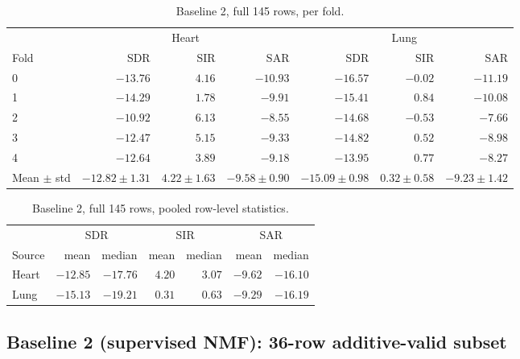 \documentclass[11pt]{article}
\begin{document}
\begin{table}[H]
\centering
\caption{Baseline 2, full 145 rows, per fold.}
\small
\begin{tabular}{@{}lrrrrrr@{}}
\toprule
& \multicolumn{3}{c}{Heart} & \multicolumn{3}{c}{Lung} \\
Fold & SDR & SIR & SAR & SDR & SIR & SAR \\
\midrule
0 & $-13.76$ & $4.16$ & $-10.93$ & $-16.57$ & $-0.02$ & $-11.19$ \\
1 & $-14.29$ & $1.78$ & $-9.91$  & $-15.41$ & $0.84$  & $-10.08$ \\
2 & $-10.92$ & $6.13$ & $-8.55$  & $-14.68$ & $-0.53$ & $-7.66$ \\
3 & $-12.47$ & $5.15$ & $-9.33$  & $-14.82$ & $0.52$  & $-8.98$ \\
4 & $-12.64$ & $3.89$ & $-9.18$  & $-13.95$ & $0.77$  & $-8.27$ \\
\midrule
Mean $\pm$ std & $-12.82\pm1.31$ & $4.22\pm1.63$ & $-9.58\pm0.90$ & $-15.09\pm0.98$ & $0.32\pm0.58$ & $-9.23\pm1.42$ \\
\bottomrule
\end{tabular}
\end{table}

\begin{table}[H]
\centering
\caption{Baseline 2, full 145 rows, pooled row-level statistics.}
\small
\begin{tabular}{@{}lrrrrrr@{}}
\toprule
& \multicolumn{2}{c}{SDR} & \multicolumn{2}{c}{SIR} & \multicolumn{2}{c}{SAR} \\
Source & mean & median & mean & median & mean & median \\
\midrule
Heart & $-12.85$ & $-17.76$ & $4.20$ & $3.07$ & $-9.62$ & $-16.10$ \\
Lung  & $-15.13$ & $-19.21$ & $0.31$ & $0.63$ & $-9.29$ & $-16.19$ \\
\bottomrule
\end{tabular}
\end{table}

\subsection{Baseline 2 (supervised NMF): 36-row additive-valid subset}
\end{document}
